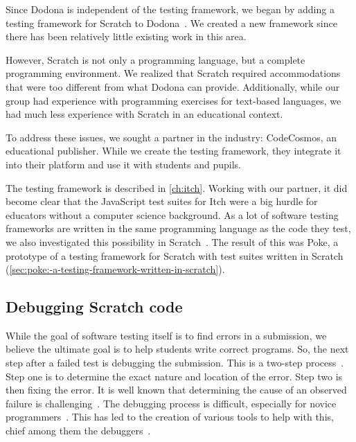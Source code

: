 \documentclass[./main]{subfiles}
\begin{document}
Since Dodona is independent of the testing framework, we began by adding a testing framework for Scratch to Dodona~\autocite{makItchEenEducatief2019}.
We created a new framework since there has been relatively little existing work in this area.

However, Scratch is not only a programming language, but a complete programming environment.
We realized that Scratch required accommodations that were too different from what Dodona can provide.
Additionally, while our group had experience with programming exercises for text-based languages, we had much less experience with Scratch in an educational context.

To address these issues, we sought a partner in the industry: CodeCosmos, an educational publisher.
While we create the testing framework, they integrate it into their platform and use it with students and pupils.

The testing framework is described in \cref{ch:itch}.
Working with our partner, it did become clear that the JavaScript test suites for Itch were a big hurdle for educators without a computer science background.
As a lot of software testing frameworks are written in the same programming language as the code they test, we also investigated this possibility in Scratch~\autocite{voetenEenBlokgebaseerdTestframework2023}.
The result of this was Poke, a prototype of a testing framework for Scratch with test suites written in Scratch (\cref{sec:poke:-a-testing-framework-written-in-scratch}).

\subsection{Debugging Scratch code}\label{subsec:debugging-scratch-code}

While the goal of software testing itself is to find errors in a submission, we believe the ultimate goal is to help students write correct programs.
So, the next step after a failed test is debugging the submission.
This is a two-step process~\autocite{myersArtSoftwareTesting2012}.
Step one is to determine the exact nature and location of the error.
Step two is then fixing the error.
It is well known that determining the cause of an observed failure is challenging~\autocite{ammannIntroductionSoftwareTesting2016}.
The debugging process is difficult, especially for novice programmers~\autocite{mccauleyDebuggingReviewLiterature2008}.
This has led to the creation of various tools to help with this, chief among them the debuggers~\autocite{rosenbergHowDebuggersWork1996}.
\end{document}

